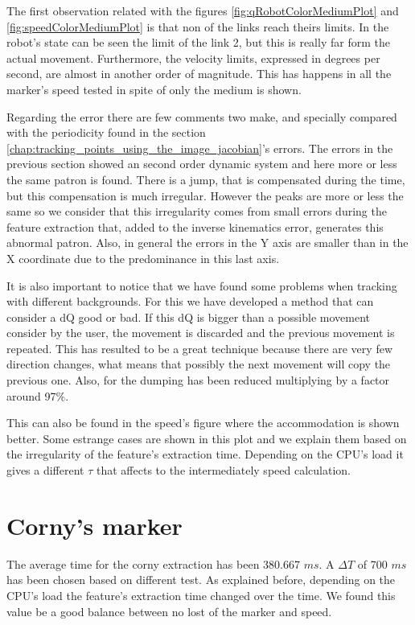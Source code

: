 		\ifx \plots \yes
			\qRobotColorMediumPlot
		\fi

		\ifx \plots \yes
			\speedColorMediumPlot
		\fi

		\ifx \plots \yes
			\errorColorPlot
		\fi

		The first observation related with the figures \ref{fig:qRobotColorMediumPlot} and \ref{fig:speedColorMediumPlot} is that non of the links reach theirs limits. 
		In the robot's state can be seen the limit of the link 2, but this is really far form the actual movement. 
		Furthermore, the velocity limits, expressed in degrees per second, are almost in another order of magnitude. This has happens in all the marker's speed tested in spite of only the medium is shown.

		Regarding the error there are few comments two make, and specially compared with the periodicity found in the section \ref{chap:tracking_points_using_the_image_jacobian}'s errors. 
		The errors in the previous section showed an second order dynamic system and here more or less the same patron is found. 
		There is a jump, that is compensated during the time, but this compensation is much irregular. 
		However the peaks are more or less the same so we consider that this irregularity comes from small errors during the feature extraction that, added to the inverse kinematics error, generates this abnormal patron. 
		Also, in general the errors in the Y axis are smaller than in the X coordinate due to the predominance in this last axis.

		It is also important to notice that we have found some problems when tracking with different backgrounds. 
		For this we have developed a method that can consider a dQ good or bad. 
		If this dQ is bigger than a possible movement consider by the user, the movement is discarded and the previous movement is repeated. 
		This has resulted to be a great technique because there are very few direction changes, what means that possibly the next movement will copy the previous one. Also, for the dumping has been reduced multiplying by a factor around 97\%.

		This can also be found in the speed's figure where the accommodation is shown better. 
		Some estrange cases are shown in this plot and we explain them based on the irregularity of the feature's extraction time. 
		Depending on the CPU's load it gives a different $\tau$ that affects to the intermediately speed calculation.

	\section{Corny's marker} %
	\label{sec:corny_s_marker}
		The average time for the corny extraction has been 380.667 $ms$. A $\Delta T$ of 700 $ms$ has been chosen based on different test. 
		As explained before, depending on the CPU's load the feature's extraction time changed over the time.
		We found this value be a good balance between no lost of the marker and speed.

